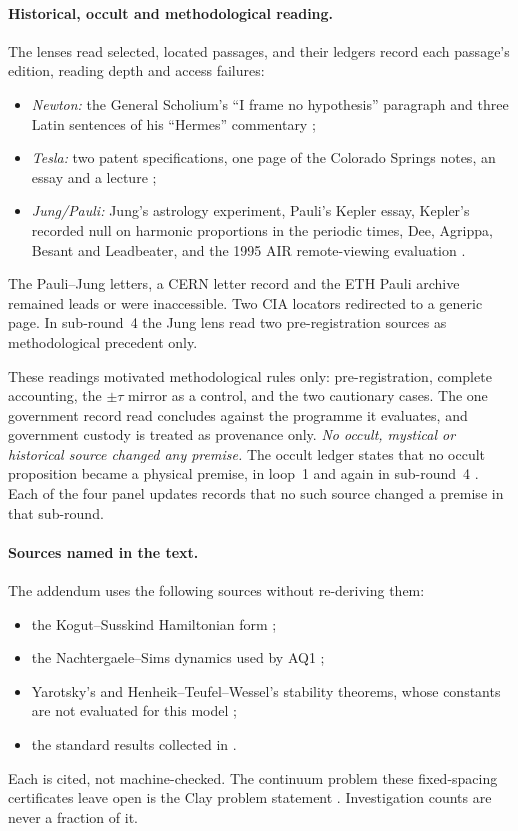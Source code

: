 \paragraph{Historical, occult and methodological reading.}
The lenses read selected, located passages, and their ledgers record each
passage's edition, reading depth and access failures:
\begin{itemize}
\item \emph{Newton:} the General Scholium's ``I frame no hypothesis''
paragraph and three Latin sentences of his ``Hermes'' commentary
\cite{newtonscholium,newtonhermes};
\item \emph{Tesla:} two patent specifications, one page of the Colorado
Springs notes, an essay and a lecture
\cite{tesla787,tesla1119,teslacs,teslacentury,teslaaiee};
\item \emph{Jung/Pauli:} Jung's astrology experiment, Pauli's Kepler essay,
Kepler's recorded null on harmonic proportions in the periodic times, Dee,
Agrippa, Besant and Leadbeater, and the 1995 AIR remote-viewing evaluation
\cite{jungsync,paulikepler,kepler,dee,agrippa,besant,air}.
\end{itemize}
The Pauli--Jung letters, a CERN letter record and the ETH Pauli archive
remained leads or were inaccessible. Two CIA locators redirected to a generic
page. In sub-round~4 the Jung lens read two pre-registration sources
\cite{naturerr,hofman} as methodological precedent only.

These readings motivated methodological rules only: pre-registration,
complete accounting, the $\pm\tau$ mirror as a control, and the two
cautionary cases. The one government record read concludes against the programme it
evaluates, and government custody is treated as provenance only.
\emph{No occult, mystical or historical source changed any premise.} The
occult ledger states that no occult proposition became a physical premise,
in loop~1 and again in sub-round~4 \cite{r32occult}. Each of the four panel
updates records that no such source changed a premise in that sub-round.

\paragraph{Sources named in the text.}
The addendum uses the following sources without re-deriving them:
\begin{itemize}
\item the Kogut--Susskind Hamiltonian form \cite{ks};
\item the Nachtergaele--Sims dynamics used by AQ1 \cite{ns};
\item Yarotsky's and Henheik--Teufel--Wessel's stability theorems, whose
constants are not evaluated for this model \cite{yarotsky,htw};
\item the standard results collected in \cite{standard}.
\end{itemize}
Each is cited, not machine-checked. The continuum problem these
fixed-spacing certificates leave open is the Clay problem statement
\cite{clay}. Investigation counts are never a fraction of it.

